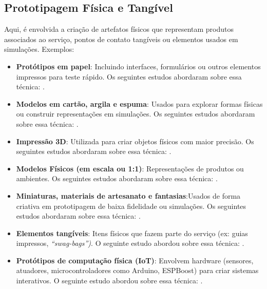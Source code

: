 \subsection{Prototipagem Física e Tangível}

Aqui, é envolvida a criação de artefatos físicos que representam produtos associados ao serviço, pontos de contato tangíveis ou elementos usados em simulações. Exemplos:

\begin{itemize}
	\item \textbf{Protótipos em papel}:  Incluindo interfaces, formulários ou outros elementos impressos para teste rápido. Os seguintes estudos abordaram sobre essa técnica: .
	
	\item \textbf{Modelos em cartão, argila e espuma}: Usados para explorar formas físicas ou construir representações em simulações. Os seguintes estudos abordaram sobre essa técnica: .
	
	\item \textbf{Impressão 3D}: Utilizada para criar objetos físicos com maior precisão. Os seguintes estudos abordaram sobre essa técnica: .
	
	\item \textbf{Modelos Físicos (em escala ou 1:1)}: Representações de produtos ou ambientes. Os seguintes estudos abordaram sobre essa técnica: .
	
	\item \textbf{Miniaturas, materiais de artesanato e fantasias}:Usados de forma criativa em prototipagem de baixa fidelidade ou simulações. Os seguintes estudos abordaram sobre essa técnica: .
	
	\item \textbf{Elementos tangíveis}: Itens físicos que fazem parte do serviço (ex: guias impressos, \textit{``swag-bags'')}. O seguinte estudo abordou sobre essa técnica: .
	
	\item \textbf{Protótipos de computação física (IoT)}: Envolvem hardware (sensores, atuadores, microcontroladores como Arduino, ESPBoost) para criar sistemas interativos. O seguinte estudo abordou sobre essa técnica: .
\end{itemize}

